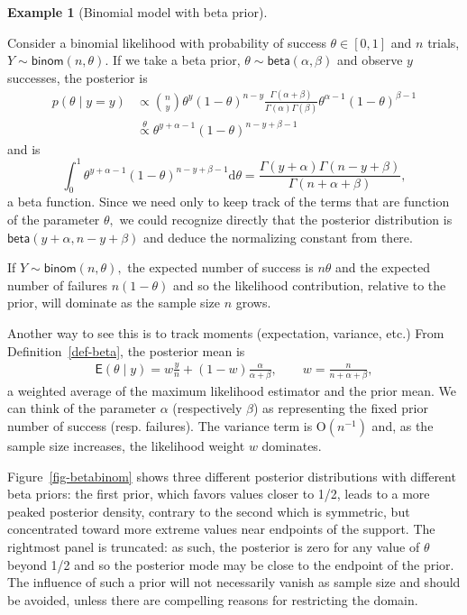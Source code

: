 \documentclass[
  11pt,
  letterpaper,
]{scrbook}
\theoremstyle{definition}
\newtheorem{example}{Example}[chapter]
\theoremstyle{plain}
\theoremstyle{plain}
\theoremstyle{plain}
\theoremstyle{definition}
\theoremstyle{definition}
\theoremstyle{plain}
\theoremstyle{plain}
\theoremstyle{remark}
\begin{document}
\begin{example}[Binomial model with beta
prior]\protect\hypertarget{exm-betabinomconjugate}{}\label{exm-betabinomconjugate}

Consider a binomial likelihood with probability of success
\(\theta \in [0,1]\) and \(n\) trials,
\(Y \sim \mathsf{binom}(n, \theta).\) If we take a beta prior,
\(\theta \sim \mathsf{beta}(\alpha, \beta)\) and observe \(y\)
successes, the posterior is \begin{align*}
p(\theta \mid y = y) &\propto \binom{n}{y} \theta^y (1-\theta)^{n-y} \frac{\Gamma(\alpha + \beta)}{\Gamma(\alpha) \Gamma(\beta)}\theta^{\alpha-1} (1-\theta)^{\beta-1}
\\&\stackrel{\theta}{\propto} \theta^{y+\alpha-1}(1-\theta)^{n-y+\beta-1}
\end{align*} and is
\[\int_{0}^{1} \theta^{y+\alpha-1}(1-\theta)^{n-y+\beta-1}\mathrm{d} \theta = \frac{\Gamma(y+\alpha)\Gamma(n-y+\beta)}{\Gamma(n+\alpha+\beta)},\]
a beta function. Since we need only to keep track of the terms that are
function of the parameter \(\theta,\) we could recognize directly that
the posterior distribution is \(\mathsf{beta}(y+\alpha, n-y+\beta)\) and
deduce the normalizing constant from there.

If \(Y \sim \mathsf{binom}(n, \theta),\) the expected number of success
is \(n\theta\) and the expected number of failures \(n(1-\theta)\) and
so the likelihood contribution, relative to the prior, will dominate as
the sample size \(n\) grows.

Another way to see this is to track moments (expectation, variance,
etc.) From Definition~\ref{def-beta}, the posterior mean is
\begin{align*}
 \mathsf{E}(\theta \mid y) = w\frac{y}{n} + (1-w) \frac{\alpha}{\alpha+\beta}, 
 \qquad w = \frac{n}{n+\alpha + \beta},
 \end{align*} a weighted average of the maximum likelihood estimator and
the prior mean. We can think of the parameter \(\alpha\) (respectively
\(\beta\)) as representing the fixed prior number of success (resp.
failures). The variance term is \(\mathrm{O}(n^{-1})\) and, as the
sample size increases, the likelihood weight \(w\) dominates.

Figure~\ref{fig-betabinom} shows three different posterior distributions
with different beta priors: the first prior, which favors values closer
to 1/2, leads to a more peaked posterior density, contrary to the second
which is symmetric, but concentrated toward more extreme values near
endpoints of the support. The rightmost panel is truncated: as such, the
posterior is zero for any value of \(\theta\) beyond 1/2 and so the
posterior mode may be close to the endpoint of the prior. The influence
of such a prior will not necessarily vanish as sample size and should be
avoided, unless there are compelling reasons for restricting the domain.


\end{example}
\end{document}

